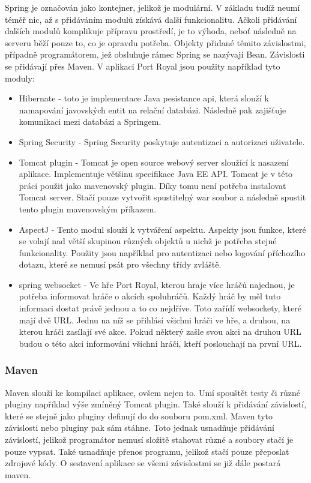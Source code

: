 \documentclass[czech,master,public,dept460,male,cpdeclaration,twoside]{diploma}
\begin{document}
Spring je označován jako kontejner, jelikož je modulární. V základu tudíž neumí téměř nic, až s přidáváním modulů získává další funkcionalitu. Ačkoli  přidávání dalších modulů komplikuje přípravu prostředí, je to výhoda, neboť následně na serveru běží pouze to, co je opravdu potřeba. Objekty přidané těmito závislostmi, případně programátorem, jež obsluhuje rámec Spring se nazývají Bean. Závislosti se přidávají přes Maven. V aplikaci Port Royal jsou použity například tyto moduly:
\begin{itemize}
	\item Hibernate - toto je implementace Java pesistance api, která slouží k namapování javovských entit na relační databázi. Následně pak zajišťuje komunikaci mezi databází a Springem.
	\item Spring Security - Spring Security poskytuje autentizaci a autorizaci uživatele.
	\item Tomcat plugin - Tomcat je open source webový server sloužící k nasazení aplikace. Implementuje většinu specifikace Java EE API. Tomcat je v této práci použit jako mavenovský plugin. Díky tomu není potřeba instalovat Tomcat server. Stačí pouze vytvořit spustitelný war soubor a následně spustit tento plugin mavenovským příkazem.
	\item AspectJ - Tento modul slouží k vytváření aspektu. Aspekty jsou funkce, které se volají nad větší skupinou různých objektů u nichž je potřeba stejné funkcionality. Použity jsou například pro autentizaci nebo logování příchozího dotazu, které se nemusí psát pro všechny třídy zvláště.
	\item spring websocket - Ve hře Port Royal, kterou hraje více hráčů najednou, je potřeba informovat hráče o akcích spoluhráčů. Každý hráč by měl tuto informaci dostat právě jednou a to co nejdříve. Toto zařídí websockety, které mají dvě URL. Jednu na níž se přihlásí všichni hráči ve hře, a druhou, na kterou hráči zasílají své akce. Pokud některý zašle svou akci na druhou URL budou o této akci informováni všichni hráči, kteří poslouchají na první URL.
\end{itemize}

\subsubsection{Maven}
Maven slouží ke kompilaci aplikace, ovšem nejen to. Umí spouštět testy či různé pluginy například výše zmíněný Tomcat plugin. Také slouží k přidávání závislostí, které se stejně jako pluginy definují do do souboru pom.xml. Maven tyto závislosti nebo pluginy pak sám stáhne. Toto jednak usnadňuje přidávání závislostí, jelikož programátor nemusí složitě stahovat různé a soubory stačí je pouze vypsat. Také usnadňuje přenos programu, jelikož stačí pouze přeposlat zdrojové kódy. O sestavení aplikace se všemi závislostmi se již dále postará maven.
\end{document}
